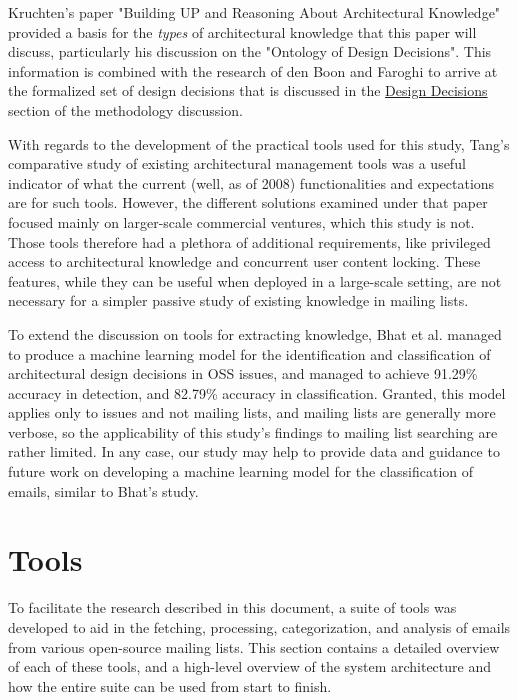\documentclass[a4paper, 12pt]{article}
\begin{document}
	Kruchten's paper "Building UP and Reasoning About Architectural Knowledge" provided a basis for the \textit{types} of architectural knowledge that this paper will discuss, particularly his discussion on the "Ontology of Design Decisions"\cite{kruchten}. This information is combined with the research of den Boon\cite{denboon} and Faroghi\cite{faroghi} to arrive at the formalized set of design decisions that is discussed in the \hyperref[sec:design-decisions]{Design Decisions} section of the methodology discussion.
	
	With regards to the development of the practical tools used for this study, Tang's comparative study of existing architectural management tools\cite{tang} was a useful indicator of what the current (well, as of 2008) functionalities and expectations are for such tools. However, the different solutions examined under that paper focused mainly on larger-scale commercial ventures, which this study is not. Those tools therefore had a plethora of additional requirements, like privileged access to architectural knowledge and concurrent user content locking. These features, while they can be useful when deployed in a large-scale setting, are not necessary for a simpler passive study of existing knowledge in mailing lists.
	
	To extend the discussion on tools for extracting knowledge, Bhat et al. managed to produce a machine learning model for the identification and classification of architectural design decisions in OSS issues, and managed to achieve 91.29\% accuracy in detection, and 82.79\% accuracy in classification\cite{bhat}. Granted, this model applies only to issues and not mailing lists, and mailing lists are generally more verbose, so the applicability of this study's findings to mailing list searching are rather limited. In any case, our study may help to provide data and guidance to future work on developing a machine learning model for the classification of emails, similar to Bhat's study.

\section{Tools}
	To facilitate the research described in this document, a suite of tools was developed to aid in the fetching, processing, categorization, and analysis of emails from various open-source mailing lists. This section contains a detailed overview of each of these tools, and a high-level overview of the system architecture and how the entire suite can be used from start to finish.
	
\end{document}

